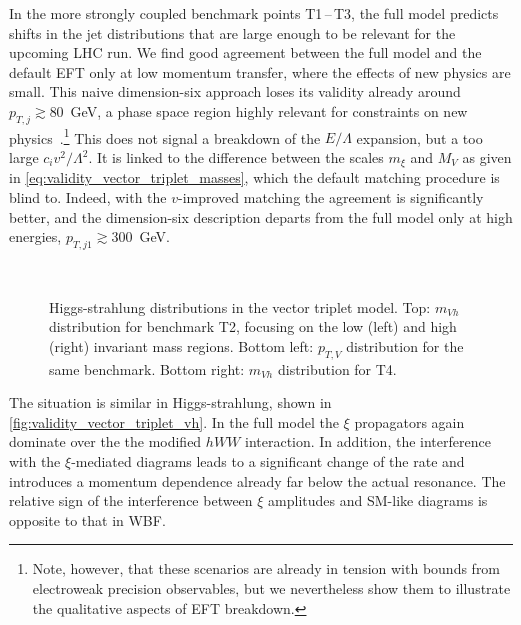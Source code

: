 In the more strongly coupled benchmark points T1\,--\,T3, the full
model predicts shifts in the jet distributions that are large enough
to be relevant for the upcoming LHC run. We find good agreement
between the full model and the default EFT only at low momentum
transfer, where the effects of new physics are small.  This naive
dimension-six approach loses its validity already around
$p_{T,j} \gtrsim 80$~GeV, a phase space region highly relevant for
constraints on new physics~\cite{Corbett:2015ksa}.\footnote{Note,
  however, that these scenarios are already in tension with bounds
  from electroweak precision observables, but we nevertheless show
  them to illustrate the qualitative aspects of EFT breakdown.} This
does not signal a breakdown of the $E / \Lambda$ expansion, but a too
large $c_i v^2 / \Lambda^2$. It is linked to the difference between
the scales $m_\xi$ and $M_V$ as given in
\autoref{eq:validity_vector_triplet_masses}, which the default
matching procedure is blind to. Indeed, with the $v$-improved matching
the agreement is significantly better, and the dimension-six
description departs from the full model only at high energies,
$p_{T,j1} \gtrsim 300$~GeV.

\begin{figure}
  \\%
  \caption{Higgs-strahlung distributions in the vector triplet model.
    Top: $m_{Vh}$ distribution for benchmark T2, focusing on the low
    (left) and high (right) invariant mass regions. Bottom left:
    $p_{T,V}$ distribution for the same benchmark. Bottom right:
    $m_{Vh}$ distribution for T4.}
  \label{fig:validity_vector_triplet_vh}
\end{figure}

The situation is similar in Higgs-strahlung, shown in
\autoref{fig:validity_vector_triplet_vh}.  In the full model the $\xi$
propagators again dominate over the the modified $hWW$ interaction.
In addition, the interference with the $\xi$-mediated diagrams leads
to a significant change of the rate and introduces a momentum
dependence already far below the actual resonance.  The relative sign
of the interference between $\xi$ amplitudes and SM-like diagrams is
opposite to that in WBF.

